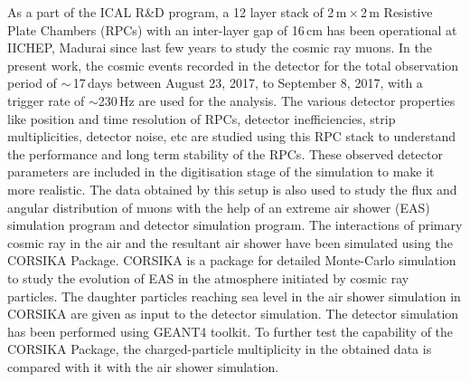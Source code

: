\documentclass[a4paper,12pt,twoside]{article}
\begin{document}
As a part of the ICAL R\&D program, a 12 layer stack of 2\,m\,$\times$\,2\,m Resistive Plate Chambers (RPCs) with an inter-layer gap of 16\,cm has been operational at IICHEP, Madurai since last few years to study the cosmic ray muons. In the present work, the cosmic events recorded in the detector for the total observation period of $\sim$\,17\,days between August 23, 2017, to September 8, 2017, with a trigger rate of $\sim$230\,Hz are used for the analysis. The various detector properties like position and time resolution of RPCs, detector inefficiencies, strip multiplicities, detector noise, etc are studied using this RPC stack to understand the performance and long term stability of the RPCs. These observed detector parameters are included in the digitisation stage of the simulation to make it more realistic.\cite{pethu1} The data obtained by this setup is also used to study the flux and angular distribution of muons with the help of an extreme air shower (EAS) simulation program and detector simulation program. The interactions of primary cosmic ray in the air and the resultant air shower have been simulated using the CORSIKA Package\cite{corsika763}. CORSIKA is a package for detailed Monte-Carlo simulation to study the evolution of EAS in the atmosphere initiated by cosmic ray particles. The daughter particles reaching sea level in the air shower simulation in CORSIKA are given as input to the detector simulation. The detector simulation has been performed using GEANT4 toolkit\cite{geant4}. To further test the capability of the CORSIKA Package, the charged-particle multiplicity in the obtained data is compared with it with the air shower simulation.
\end{document}
